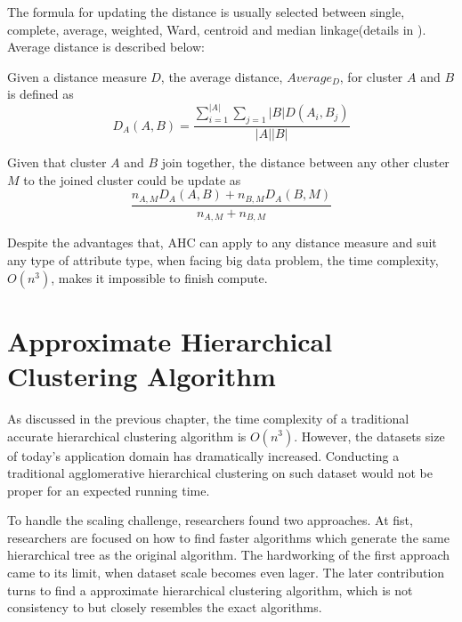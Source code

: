 \documentclass[utf8,english]{gradu3}
\begin{document}
The formula for updating the distance is usually selected between single, complete, average, weighted, Ward, centroid and median linkage(details in \cite{mullner2012fastcluster}). Average distance is described below:

\begin{definition}
	\label{def:average_distance}
	Given a distance measure $D$, the average distance, $Average_D$, for cluster $A$ and $B$ is defined as
	\[
	D_A \left(A, B \right) = \frac{
			\sum\limits_{i=1}^{\lvert  A\rvert } \sum\limits_{j=1} \lvert B \lvert D \left(A_i, B_j \right)		
		}{
			\lvert A \lvert	\lvert B \lvert
		}
	\]
\end{definition}


\begin{definition}
	\label{def:average_updating}
	Given that cluster $A$ and $B$ join together, the distance between any other cluster $M$ to the joined cluster could be update as
	\[
	\frac{
		n_{A,M} D_A \left( A, B \right) + n_{B,M} D_A \left( B, M \right)
		}{
		n_{A, M} + n_{B,M}
		}
\]
\end{definition}


Despite the advantages that, AHC can apply to any distance measure and suit any type of attribute type, when facing big data problem, the time complexity, $O(n^3)$, makes it impossible to finish compute.


\chapter{Approximate Hierarchical Clustering Algorithm}


As discussed in the previous chapter, the time complexity of a traditional accurate hierarchical clustering algorithm is $O(n^3)$. However, the datasets size of today's application domain has dramatically increased. Conducting a traditional agglomerative hierarchical clustering on such dataset would not be proper for an expected running time.

To handle the scaling challenge, researchers found two approaches. At fist, researchers are focused on how to find faster algorithms which generate the same hierarchical tree as the original algorithm. The hardworking of the first approach came to its limit, when dataset scale becomes even lager. The later contribution turns to find a approximate hierarchical clustering algorithm, which is not consistency to but closely resembles the exact algorithms. 
\end{document}
